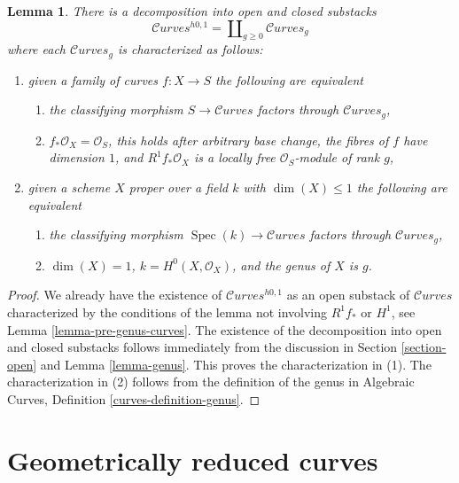 \documentclass{stacks-project}
\theoremstyle{plain}
\newtheorem{lemma}[subsection]{Lemma}
\theoremstyle{definition}
\theoremstyle{remark}
\numberwithin{equation}{subsection}
\def\Spec{\mathop{\mathrm{Spec}}}
\def\Curvesstack{\mathcal{C}\!\mathit{urves}}
\begin{document}
\begin{lemma}
\label{lemma-pre-genus-one-piece-per-genus}
There is a decomposition into open and closed substacks
$$
\Curvesstack^{h0, 1} = \coprod\nolimits_{g \geq 0} \Curvesstack_g
$$
where each $\Curvesstack_g$ is characterized as follows:
\begin{enumerate}
\item given a family of curves $f : X \to S$ the following are equivalent
\begin{enumerate}
\item the classifying morphism $S \to \Curvesstack$ factors
through $\Curvesstack_g$,
\item $f_*\mathcal{O}_X = \mathcal{O}_S$, this holds after
arbitrary base change, the fibres of $f$ have dimension $1$, and
$R^1f_*\mathcal{O}_X$ is a locally free $\mathcal{O}_S$-module of rank $g$,
\end{enumerate}
\item given a scheme $X$ proper over a field $k$ with $\dim(X) \leq 1$
the following are equivalent
\begin{enumerate}
\item the classifying morphism $\Spec(k) \to \Curvesstack$ factors
through $\Curvesstack_g$,
\item $\dim(X) = 1$, $k = H^0(X, \mathcal{O}_X)$, and
the genus of $X$ is $g$.
\end{enumerate}
\end{enumerate}
\end{lemma}

\begin{proof}
We already have the existence of $\Curvesstack^{h0, 1}$ as an open
substack of $\Curvesstack$ characterized by the conditions of the
lemma not involving $R^1f_*$ or $H^1$, see Lemma \ref{lemma-pre-genus-curves}.
The existence of the decomposition into open and closed substacks
follows immediately from the discussion in Section \ref{section-open}
and Lemma \ref{lemma-genus}. This proves the characterization in (1).
The characterization in (2) follows from the definition of the
genus in Algebraic Curves, Definition \ref{curves-definition-genus}.
\end{proof}









\section{Geometrically reduced curves}
\label{section-geometrically-reduced}
\end{document}
